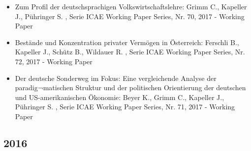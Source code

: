 \begin{itemize}
	 \item Zum Profil der deutschsprachigen Volkswirtschaftslehre: Grimm C., Kapeller J., Pühringer S. , Serie ICAE Working Paper Series, Nr. 70, 2017 - Working Paper
	 \item Bestände und Konzentration privater Vermögen in Österreich: Ferschli B., Kapeller J., Schütz B., Wildauer R. , Serie ICAE Working Paper Series, Nr. 72, 2017 - Working Paper
	 \item Der deutsche Sonderweg im Fokus: Eine vergleichende Analyse der paradig¬matischen Struktur und der politischen Orientierung der deutschen und US-amerikanischen Ökonomie: Beyer K., Grimm C., Kapeller J., Pühringer S. , Serie ICAE Working Paper Series, Nr. 71, 2017 - Working Paper
\end{itemize} 
 \subsection{2016} 
